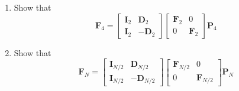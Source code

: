 \documentclass[journal,12pt,twocolumn]{IEEEtran}
\let\vec\mathbf
\renewcommand\thesection{\arabic{section}}
\begin{document}
\begin{enumerate}[label=\arabic*.,ref=\thesection.\theenumi]
    \item Show that 
\begin{equation}
	\vec{F}_{4}=
\begin{bmatrix}
	\vec{I}_{2} & \vec{D}_{2} \\
\vec{I}_{2} & -\vec{D}_{2}
\end{bmatrix}
\begin{bmatrix}
\vec{F}_{2} & 0 \\
0 & \vec{F}_{2}
\end{bmatrix}
\vec{P}_{4}
\end{equation}
\item Show that 
\begin{equation}
\vec{F}_{N}=
\begin{bmatrix}
\vec{I}_{N/2} & \vec{D}_{N/2} \\
\vec{I}_{N/2} & -\vec{D}_{N/2}
\end{bmatrix}
\begin{bmatrix}
\vec{F}_{N/2} & 0 \\
0 & \vec{F}_{N/2}
\end{bmatrix}
\vec{P}_{N}
\end{equation}


\end{enumerate}
\end{document}
